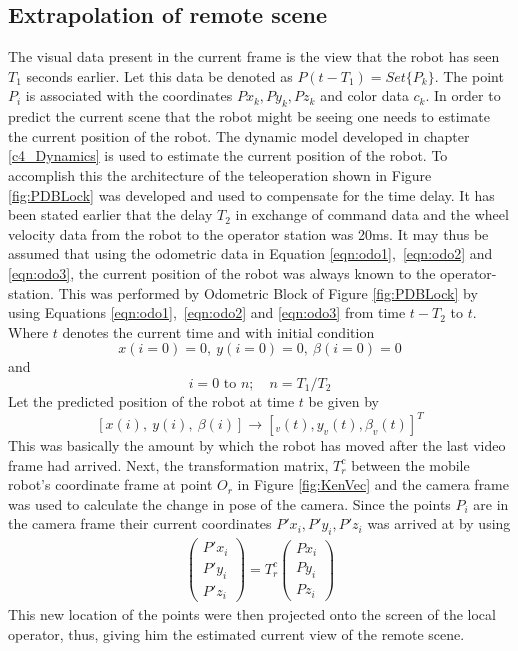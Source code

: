 \subsection{Extrapolation of remote scene } 
The visual data present in the current frame is the view that the robot has seen $T_1$ seconds earlier. Let this data be denoted as $P(t-T_1)=Set\{P_k\}$. The point $P_i$ is associated with the coordinates ${Px_k,Py_k,Pz_k}$ and color data $c_k$. In order to predict the current scene that the robot might be seeing one needs to estimate the current position of the robot. The dynamic model developed in chapter \ref{c4_Dynamics} is used to estimate the current position of the robot. To accomplish this the  architecture of the teleoperation shown in Figure \ref{fig:PDBLock} was developed and used to compensate for the time delay.
 It has been stated earlier that the delay $T_2$ in exchange of command data and the wheel velocity data from the robot to the operator station was 20ms. It may thus be assumed that  using the odometric data in Equation \ref{eqn:odo1},~\ref{eqn:odo2} and \ref{eqn:odo3}, the current position of the robot was always known to the operator-station. This was performed by Odometric Block of Figure \ref{fig:PDBLock} by using Equations \ref{eqn:odo1},~\ref{eqn:odo2} and \ref{eqn:odo3} from time $t-T_2$ to $t$. Where $t$ denotes the current time and  with initial condition \[x(i=0)=0,~y(i=0)=0 ,~ \beta(i=0)=0\] and  \[ i=0 \text{ to } n;  \quad n=T_1/T_2\] 
 Let the predicted position of the robot at time $t$ be given by 
\[[x(i),~y(i) ,~ \beta(i)]\rightarrow [_v(t),y_v(t),\beta_v(t)]^T\]
This was basically the amount by which the robot has moved after the last video frame had arrived. Next, the transformation matrix, $T^c_r$ between the mobile robot's coordinate frame at point $O_r$ in Figure \ref{fig:KenVec} and the camera frame was used to calculate the change in pose of the camera. Since the points $P_i$ are in the camera frame their current coordinates ${P'x_i,P'y_i,P'z_i}$ was arrived at by using 
\begin{eqnarray}
\begin{pmatrix}
P'x_i \\ P'y_i \\P'z_i
\end{pmatrix}=T^c_r
\begin{pmatrix}
Px_i\\Py_i\\Pz_i
\end{pmatrix}
\end{eqnarray}
This new location of the points were then  projected onto the screen of the local operator, thus, giving him the estimated current view of the remote scene. 
